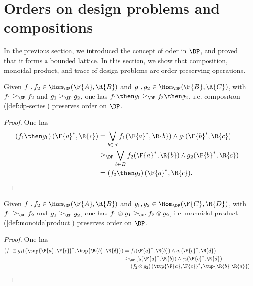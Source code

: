 \section{Orders on design problems and compositions}
In the previous section, we introduced the concept of oder in $\DP$, and proved that it forms a bounded lattice. In this section, we show that composition, monoidal product, and trace of design problems are order-preserving operations.
\begin{lemma}
Given $f_1,f_2 \in \Hom_\DP(\F{A},\R{B})$ and $g_1,g_2 \in \Hom_\DP(\F{B},\R{C})$, with $f_1\geq_\DP f_2$ and $g_1\geq_\DP g_2$, one has $f_1\then g_1 \geq_\DP f_2\then g_2$, i.e. composition (\cref{def:dp-series}) preserves order on $\DP$.
\end{lemma}

\begin{proof}
One has
\begin{equation}
    \begin{aligned}
    \left( f_1\then g_1\right)(\F{a}^*,\R{c})&=\bigvee_{b\in B}f_1(\F{a}^*,\R{b})\wedge g_1(\F{b}^*,\R{c})\\
    &\geq_\DP \bigvee_{b\in B} f_2(\F{a}^*,\R{b})\wedge g_2(\F{b}^*,\R{c})\\
    &=\left( f_2\then g_2\right)(\F{a}^*,\R{c}).
    \end{aligned}
\end{equation}
\end{proof}

\begin{lemma}
Given $f_1,f_2 \in \Hom_\DP(\F{A},\R{B})$ and $g_1,g_2 \in \Hom_\DP(\F{C},\R{D})$, with $f_1\geq_\DP f_2$ and $g_1\geq_\DP g_2$, one has $f_1\otimes g_1 \geq_\DP f_2\otimes g_2$, i.e. monoidal product (\cref{def:monoidalproduct}) preserves order on $\DP$.
\end{lemma}

\begin{proof}
One has 
\begin{equation}
    \begin{aligned}
    \left( f_1\otimes g_1\right) (\tup{\F{a},\F{c}}^*,\tup{\R{b},\R{d}})&=f_1(\F{a}^*,\R{b})\wedge g_1(\F{c}^*,\R{d})\\
    &\geq_\DP f_2(\F{a}^*,\R{b})\wedge g_2(\F{c}^*,\R{d})\\
    &=\left( f_2\otimes g_2\right) (\tup{\F{a},\F{c}}^*,\tup{\R{b},\R{d}})
    \end{aligned}
\end{equation}
\end{proof}

